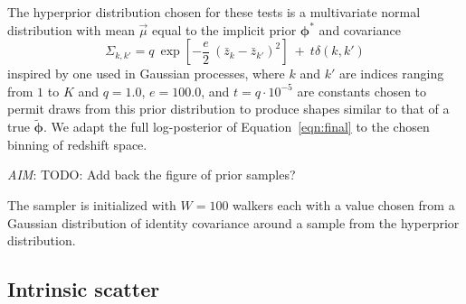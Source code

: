 \documentclass[iop]{emulateapj}
\newcommand{\todo}[3]{{\color{#2}\emph{#1}: #3}}
\newcommand{\aim}[1]{\todo{AIM}{red}{#1}}
\newcommand{\Eq}[1]{Equation~\ref{#1}}
\newcommand{\Fig}[1]{Figure~\ref{#1}}
\newcommand{\pr}[1]{\ensuremath{\mathrm{p}(#1)}}
\newcommand{\gvn}{\mid}%
\newcommand{\bvec}[1]{\ensuremath{\boldsymbol{#1}}}
\newcommand{\ndphi}{\bvec{\phi}}
\begin{document}
The hyperprior distribution chosen for these tests is a multivariate normal distribution with mean $\vec{\mu}$ equal to the implicit prior $\ndphi^{*}$ and covariance
\begin{equation}
\label{eqn:priorcov}
\Sigma_{k,k'} = q\ \exp[-\frac{e}{2}\ (\bar{z}_{k}-\bar{z}_{k'})^{2}]\ +\ t\delta(k,k')
\end{equation}
inspired by one used in Gaussian processes, where $k$ and $k'$ are indices ranging from $1$ to $K$ and $q=1.0$, $e=100.0$, and $t=q\cdot10^{-5}$ are constants chosen to permit draws from this prior distribution to produce shapes similar to that of a true $\tilde{\ndphi}$.  
We adapt the full log-posterior of \Eq{eqn:final} to the chosen binning of redshift space.

%
 \aim{TODO: Add back the figure of prior samples?}

The sampler is initialized with $W=100$ walkers each with a value chosen from a Gaussian distribution of identity covariance around a sample from the hyperprior distribution.  

\subsection{Intrinsic scatter}
\label{sec:scatter}

\end{document}
